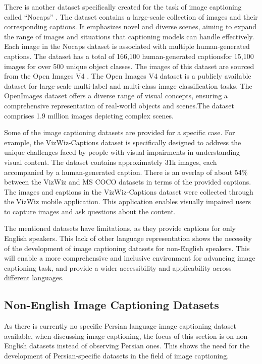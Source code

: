 \documentclass[runningheads]{llncs}
\begin{document}
There is another dataset specifically created for the task of image captioning called ``Nocaps'' \cite{Nocaps}. The dataset contains a large-scale collection of images and their corresponding captions. It emphasizes novel and diverse scenes, aiming to expand the range of images and situations that captioning models can handle effectively. Each image in the Nocaps dataset is associated with multiple human-generated captions. The dataset has a total of 166,100 human-generated captionsfor 15,100 images for over 500 unique object classes. The images of this dataset are sourced from the Open Images V4 \cite{Openimages}. The Open Images V4 dataset is a publicly available dataset for large-scale multi-label and multi-class image classification tasks. The OpenImages dataset offers a diverse range of visual concepts, ensuring a comprehensive representation of real-world objects and scenes.The dataset comprises 1.9 million images depicting complex scenes.

Some of the image captioning datasets are provided for a specific case. For example, the VizWiz-Captions dataset \cite{VizWiz} is specifically designed to address the unique challenges faced by people with visual impairments in understanding visual content. The dataset contains approximately 31k images, each accompanied by a human-generated caption. 
There is an overlap of about 54\% between the VizWiz and MS COCO datasets in terms of the provided captions. The images and captions in the VizWiz-Captions dataset were collected through the VizWiz mobile application. This application enables visually impaired users to capture images and ask questions about the content.

The mentioned datasets have limitations, as they provide captions for only English speakers. This lack of other language representation shows the necessity of the development of image captioning datasets for non-English speakers. This will enable a more comprehensive and inclusive environment for advancing image captioning task, and provide a wider accessibility and applicability across different languages.

\subsection{Non-English Image Captioning Datasets}
As there is currently no specific Persian language image captioning dataset available, when discussing image captioning, the focus of this section is on non-English datasets instead of observing Persian ones. This shows the need for the development of Persian-specific datasets in the field of image captioning.
\end{document}

